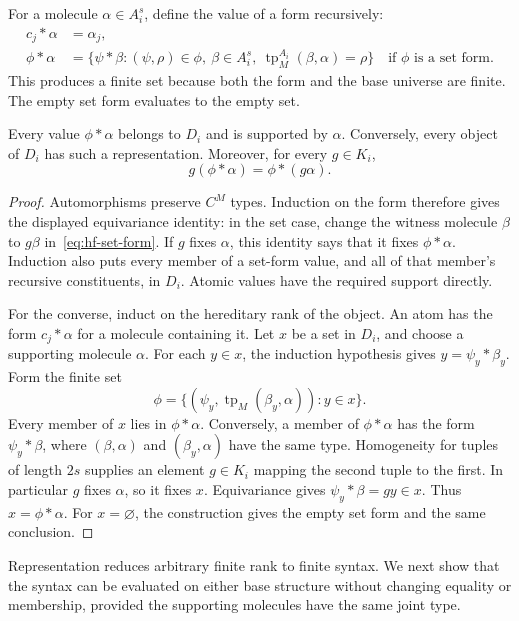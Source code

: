 For a molecule $\alpha\in A_i^s$, define the value of a form recursively:
\begin{align}
 c_j*\alpha&=\alpha_j, \label{eq:hf-atomic-form}\\
 \phi*\alpha&=
 \{\psi*\beta:
        (\psi,\rho)\in\phi,
        \ \beta\in A_i^s,
        \ \operatorname{tp}_M^{A_i}(\beta,\alpha)=\rho\}
       \quad\text{if $\phi$ is a set form}.
       \label{eq:hf-set-form}
\end{align}
This produces a finite set because both the form and the base universe
are finite.  The empty set form evaluates to the empty set.

\begin{lemma}[Representation]
\label{lem:hf-representation}
Every value $\phi*\alpha$ belongs to $D_i$ and is supported by $\alpha$.
Conversely, every object of $D_i$ has such a representation.  Moreover,
for every $g\in K_i$,
\[
 g(\phi*\alpha)=\phi*(g\alpha).
\]
\end{lemma}

\begin{proof}
Automorphisms preserve $C^M$ types.  Induction on the form therefore gives
the displayed equivariance identity: in the set case, change the witness
molecule $\beta$ to $g\beta$ in~\eqref{eq:hf-set-form}.  If $g$ fixes
$\alpha$, this identity says that it fixes $\phi*\alpha$.  Induction also
puts every member of a set-form value, and all of that member's recursive
constituents, in $D_i$.  Atomic values have the required support directly.

For the converse, induct on the hereditary rank of the object.  An atom
has the form $c_j*\alpha$ for a molecule containing it.  Let $x$ be a set
in $D_i$, and choose a supporting molecule $\alpha$.  For each $y\in x$,
the induction hypothesis gives $y=\psi_y*\beta_y$.  Form the finite set
\[
 \phi=\{(\psi_y,\operatorname{tp}_M(\beta_y,\alpha)):y\in x\}.
\]
Every member of $x$ lies in $\phi*\alpha$.  Conversely, a member of
$\phi*\alpha$ has the form $\psi_y*\beta$, where
$(\beta,\alpha)$ and $(\beta_y,\alpha)$ have the same type.  Homogeneity
for tuples of length $2s$ supplies an element $g\in K_i$ mapping the
second tuple to the first.  In particular $g$ fixes $\alpha$, so it fixes
$x$.  Equivariance gives $\psi_y*\beta=gy\in x$.  Thus
$x=\phi*\alpha$.  For $x=\varnothing$, the construction gives the empty
set form and the same conclusion.
\end{proof}

Representation reduces arbitrary finite rank to finite syntax.  We next
show that the syntax can be evaluated on either base structure without
changing equality or membership, provided the supporting molecules have
the same joint type.

